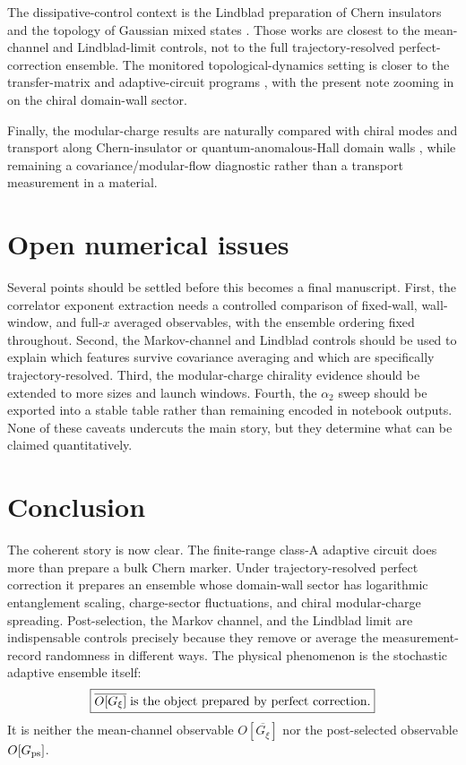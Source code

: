 \documentclass[aps,twocolumn,floatfix,superscriptaddress,nofootinbib]{revtex4-2}
\newcommand{\avg}[1]{\overline{#1}}
\newcommand{\Gtraj}{G_{\xi}}
\newcommand{\Gps}{G_{\rm ps}}
\newcommand{\Gbar}{\overline{G_{\xi}}}
\begin{document}
The dissipative-control context is the Lindblad preparation of Chern insulators
\cite{DiehlRicoBaranovZoller2011,BudichZollerDiehl2015,Goldstein2019} and the topology of
Gaussian mixed states \cite{BudichDiehl2015,BardynWawerAltlandFleischhauerDiehl2018,
WawerFleischhauer2021}.  Those works are closest to the mean-channel and Lindblad-limit
controls, not to the full trajectory-resolved perfect-correction ensemble.  The monitored
topological-dynamics setting is closer to the transfer-matrix and adaptive-circuit programs
\cite{JianBauerKeselmanLudwig2022,PanShapourianJian2025,BhuiyanPanJian2026}, with the
present note zooming in on the chiral domain-wall sector.

Finally, the modular-charge results are naturally compared with chiral modes and transport
along Chern-insulator or quantum-anomalous-Hall domain walls
\cite{CallanHarvey1985,Hatsugai1993,QiWuZhang2006,UpadhyayaTserkovnyak2016,RosenEtAl2017},
while remaining a covariance/modular-flow diagnostic rather than a transport measurement in
a material.

\section{Open numerical issues}

Several points should be settled before this becomes a final manuscript.
First, the correlator exponent extraction needs a controlled comparison of fixed-wall,
wall-window, and full-$x$ averaged observables, with the ensemble ordering fixed throughout.
Second, the Markov-channel and Lindblad controls should be used to explain which features
survive covariance averaging and which are specifically trajectory-resolved.  Third, the
modular-charge chirality evidence should be extended to more sizes and launch windows.
Fourth, the $\alpha_2$ sweep should be exported into a stable table rather than remaining
encoded in notebook outputs.  None of these caveats undercuts the main story, but they
determine what can be claimed quantitatively.

\section{Conclusion}

The coherent story is now clear.  The finite-range class-A adaptive circuit does more than
prepare a bulk Chern marker.  Under trajectory-resolved perfect correction it prepares an
ensemble whose domain-wall sector has logarithmic entanglement scaling, charge-sector
fluctuations, and chiral modular-charge spreading.  Post-selection, the Markov channel, and
the Lindblad limit are indispensable controls precisely because they remove or average the
measurement-record randomness in different ways.  The physical phenomenon is the stochastic
adaptive ensemble itself:
\[
  \boxed{
  \avg{O[\Gtraj]}
  \;\hbox{is the object prepared by perfect correction.}
  }
\]
It is neither the mean-channel observable $O[\Gbar]$ nor the post-selected observable
$O[\Gps]$.
\end{document}
